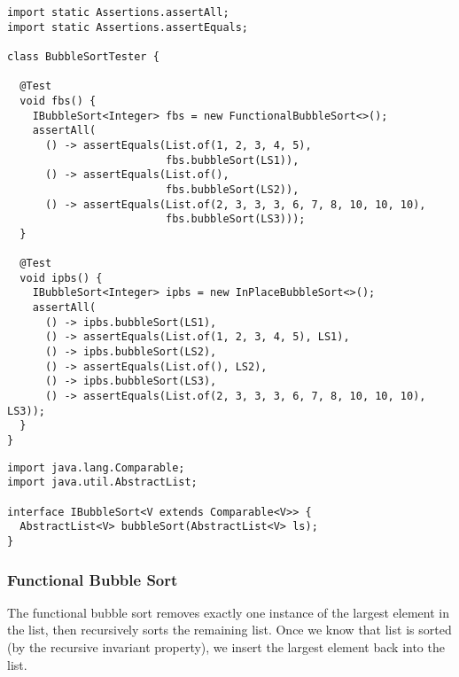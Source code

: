 \begin{lstlisting}[language=MyJava]
import static Assertions.assertAll;
import static Assertions.assertEquals;

class BubbleSortTester {

  @Test
  void fbs() {
    IBubbleSort<Integer> fbs = new FunctionalBubbleSort<>();
    assertAll(
      () -> assertEquals(List.of(1, 2, 3, 4, 5), 
                         fbs.bubbleSort(LS1)),
      () -> assertEquals(List.of(), 
                         fbs.bubbleSort(LS2)),
      () -> assertEquals(List.of(2, 3, 3, 3, 6, 7, 8, 10, 10, 10), 
                         fbs.bubbleSort(LS3)));
  }

  @Test
  void ipbs() {
    IBubbleSort<Integer> ipbs = new InPlaceBubbleSort<>();
    assertAll(
      () -> ipbs.bubbleSort(LS1),
      () -> assertEquals(List.of(1, 2, 3, 4, 5), LS1),
      () -> ipbs.bubbleSort(LS2),
      () -> assertEquals(List.of(), LS2),
      () -> ipbs.bubbleSort(LS3),
      () -> assertEquals(List.of(2, 3, 3, 3, 6, 7, 8, 10, 10, 10), LS3));
  }
}
\end{lstlisting}

\begin{lstlisting}[language=MyJava]
import java.lang.Comparable;
import java.util.AbstractList;

interface IBubbleSort<V extends Comparable<V>> {
  AbstractList<V> bubbleSort(AbstractList<V> ls);
}
\end{lstlisting}

\subsubsection*{Functional Bubble Sort}
The functional bubble sort removes exactly one instance of the largest element in the list, then recursively sorts the remaining list. Once we know that list is sorted (by the recursive invariant property), we insert the largest element back into the list.


